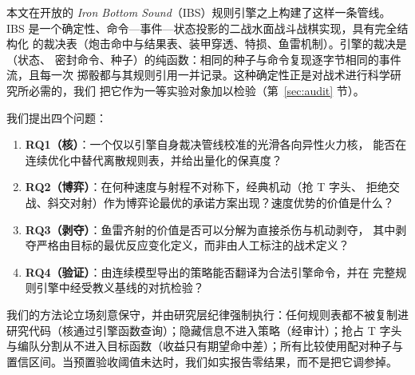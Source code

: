 \documentclass[12pt,a4paper]{ctexart}
\begin{document}
本文在开放的 \emph{Iron Bottom Sound}（IBS）规则引擎之上构建了这样一条管线。
IBS 是一个确定性、命令—事件—状态投影的二战水面战斗战棋实现，具有完全结构化
的裁决表（炮击命中与结果表、装甲穿透、特损、鱼雷机制）。引擎的裁决是（状态、
密封命令、种子）的纯函数：相同的种子与命令复现逐字节相同的事件流，且每一次
掷骰都与其规则引用一并记录。这种确定性正是对战术进行科学研究所必需的，我们
把它作为一等实验对象加以检验（第~\ref{sec:audit} 节）。

我们提出四个问题：
\begin{enumerate}
\item \textbf{RQ1（核）}：一个仅以引擎自身裁决管线校准的光滑各向异性火力核，
能否在连续优化中替代离散规则表，并给出量化的保真度？
\item \textbf{RQ2（博弈）}：在何种速度与射程不对称下，经典机动（抢 T 字头、
拒绝交战、斜交对射）作为博弈论最优的承诺方案出现？速度优势的价值是什么？
\item \textbf{RQ3（剥夺）}：鱼雷齐射的价值是否可以分解为直接杀伤与机动剥夺，
其中剥夺严格由目标的最优反应变化定义，而非由人工标注的战术定义？
\item \textbf{RQ4（验证）}：由连续模型导出的策略能否翻译为合法引擎命令，并在
完整规则引擎中经受教义基线的对抗检验？
\end{enumerate}

我们的方法论立场刻意保守，并由研究层纪律强制执行：任何规则表都不被复制进
研究代码（核通过引擎函数查询）；隐藏信息不进入策略（经审计）；抢占 T 字头
与编队分割从不进入目标函数（收益只有期望命中差）；所有比较使用配对种子与
置信区间。当预置验收阈值未达时，我们如实报告零结果，而不是把它调参掉。
\end{document}
